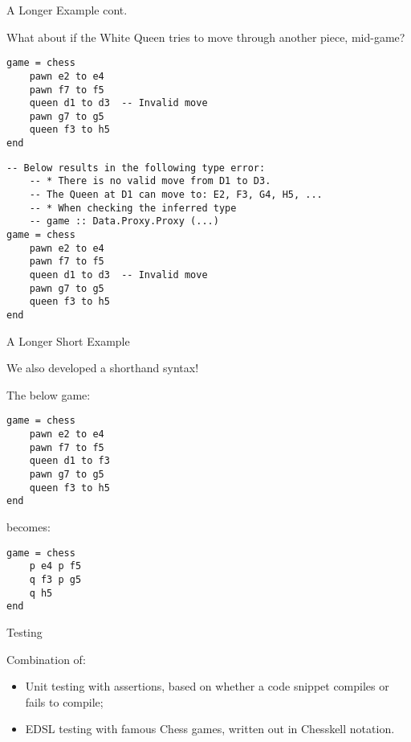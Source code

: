 \documentclass{beamer}
\begin{document}
\begin{frame}[fragile]{A Longer Example cont.}

What about if the White Queen tries to move through another piece, mid-game?

\begin{overprint}

\begin{lstlisting}
game = chess
    pawn e2 to e4
    pawn f7 to f5
    queen d1 to d3  -- Invalid move
    pawn g7 to g5
    queen f3 to h5
end
\end{lstlisting}

\begin{lstlisting}
-- Below results in the following type error:
    -- * There is no valid move from D1 to D3.
    -- The Queen at D1 can move to: E2, F3, G4, H5, ...
    -- * When checking the inferred type
    -- game :: Data.Proxy.Proxy (...)
game = chess
    pawn e2 to e4
    pawn f7 to f5
    queen d1 to d3  -- Invalid move
    pawn g7 to g5
    queen f3 to h5
end
\end{lstlisting}

\end{overprint}

\end{frame}

\begin{frame}[fragile]{A Longer Short Example}

We also developed a shorthand syntax! 

\pause

The below game:

\begin{lstlisting}
game = chess
    pawn e2 to e4
    pawn f7 to f5
    queen d1 to f3
    pawn g7 to g5
    queen f3 to h5
end
\end{lstlisting}

\pause

becomes:

\begin{lstlisting}
game = chess
    p e4 p f5
    q f3 p g5
    q h5
end
\end{lstlisting}

\end{frame}

\begin{frame}{Testing}

Combination of:

\pause

\begin{itemize}
    \item<2-> Unit testing with assertions, based on whether a code snippet compiles or fails to compile;
    \item<3-> EDSL testing with famous Chess games, written out in Chesskell notation.
\end{itemize}
    
\end{frame}
\end{document}
